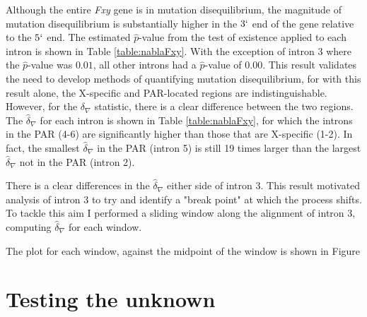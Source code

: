 Although the entire \textit{Fxy} gene is in mutation disequilibrium, the magnitude of mutation disequilibrium is substantially higher in the $3`$ end of the gene relative to the $5`$ end. The estimated $\hat p$-value from the test of existence applied to each intron is shown in Table \ref{table:nablaFxy}. With the exception of intron 3 where the $\hat p$-value was $0.01$, all other introns had a $\hat p$-value of $0.00$. This result validates the need to develop methods of quantifying mutation disequilibrium, for with this result alone, the X-specific and PAR-located regions are indistinguishable. However, for the $\delta_\nabla$ statistic, there is a clear difference between the two regions. The $\hat \delta_\nabla$ for each intron is shown in Table \ref{table:nablaFxy}, for which the introns in the PAR (4-6) are significantly higher than those that are X-specific (1-2). In fact, the smallest $\hat \delta_\nabla$ in the PAR (intron 5) is still 19 times larger than the largest $\hat \delta_\nabla$ not in the PAR (intron 2).



There is a clear differences in the $\hat \delta_\nabla$ either side of intron 3. This result motivated analysis of intron 3 to try and identify a "break point" at which the process shifts. To tackle this aim I performed a sliding window along the alignment of intron 3, computing $\hat \delta_\nabla$ for each window. 

The plot for each window, against the midpoint of the window is shown in Figure 






\section{Testing the unknown}